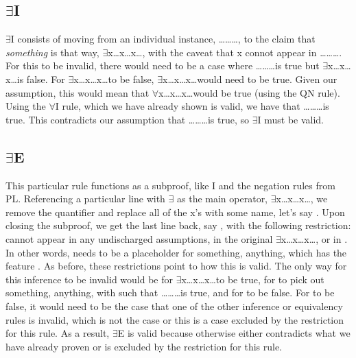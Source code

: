 \subsection{$\exists$I} 
$\exists$I consists of moving from an individual instance, \ldots {}\ldots {}\ldots, to the claim that \emph{something} is that way, $\exists$x\ldots x\ldots x\ldots, with the caveat that x connot appear in \ldots {}\ldots {}\ldots. For this to be invalid, there would need to be a case where \ldots {}\ldots {}\ldots is true but  $\exists$x\ldots x\ldots x\ldots is false. For  $\exists$x\ldots x\ldots x\ldots to be false, \enot $\exists$x\ldots x\ldots x\ldots would need to be true. Given our assumption, this would mean that  $\forall$x\enot{}\ldots x\ldots x\ldots would be true (using the QN rule). Using the $\forall$I rule, which we have already shown is valid, we have that \enot{}\ldots {}\ldots {}\ldots is true. This contradicts our assumption that \ldots {}\ldots {}\ldots is true, so $\exists$I must be valid. 

\subsection{$\exists$E}
This particular rule functions as a subproof, like \eif I and the negation rules from PL. Referencing a particular line with $\exists$ as the main operator, $\exists$x\ldots x\ldots x\ldots, we remove the quantifier and replace all of the x's with some name, let's say . Upon closing the subproof, we get the last line back, say , with the following restriction:  cannot appear in any undischarged assumptions, in the original $\exists$x\ldots x\ldots x\ldots, or in . In other words,  needs to be a placeholder for something, anything, which has the feature . As before, these restrictions point to how this is valid. The only way for this inference to be invalid would be for  $\exists$x\ldots x\ldots x\ldots to be true, for  to pick out something, anything, with such that \ldots {}\ldots{}\ldots is true, and for  to be false. For  to be false, it would need to be the case that one of the other inference or equivalency rules is invalid, which is not the case or this is a case excluded by the restriction for this rule. As a result, $\exists$E is valid because otherwise either contradicts what we have already proven or is excluded by the restriction for this rule. 

